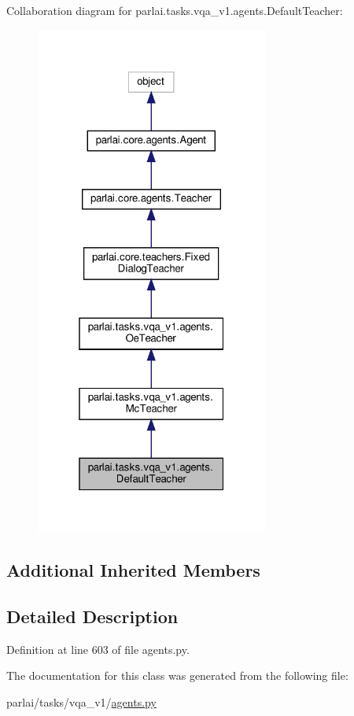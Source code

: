 Collaboration diagram for parlai.\+tasks.\+vqa\+\_\+v1.\+agents.\+Default\+Teacher\+:
\nopagebreak
\begin{figure}[H]
\begin{center}
\leavevmode
\includegraphics[width=217pt]{classparlai_1_1tasks_1_1vqa__v1_1_1agents_1_1DefaultTeacher__coll__graph}
\end{center}
\end{figure}
\subsection*{Additional Inherited Members}


\subsection{Detailed Description}


Definition at line 603 of file agents.\+py.



The documentation for this class was generated from the following file\+:\begin{DoxyCompactItemize}
\item 
parlai/tasks/vqa\+\_\+v1/\hyperlink{parlai_2tasks_2vqa__v1_2agents_8py}{agents.\+py}\end{DoxyCompactItemize}
